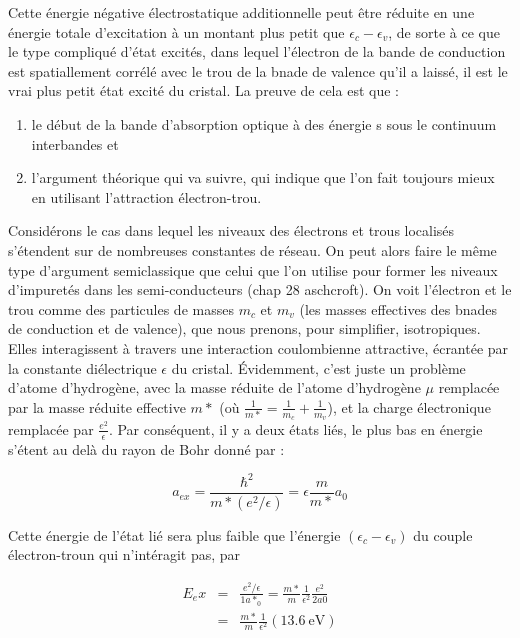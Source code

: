 Cette énergie négative électrostatique additionnelle peut être réduite en une énergie totale d'excitation à un montant plus petit que $\epsilon_c - \epsilon_v$, de sorte à ce que le type compliqué d'état excités, dans lequel l'électron de la bande de conduction est spatiallement corrélé avec le trou de la bnade de valence qu'il a laissé, il est le vrai plus petit état excité du cristal. La preuve de cela est que :
\begin{enumerate}
    \item le début de la bande d'absorption optique à des énergie s sous le continuum interbandes et
    \item l'argument théorique qui va suivre, qui indique que l'on fait toujours mieux en utilisant l'attraction électron-trou.
\end{enumerate}

Considérons le cas dans lequel les niveaux des électrons et trous localisés s'étendent sur de nombreuses constantes de réseau. On peut alors faire le même type d'argument semiclassique que celui que l'on utilise pour former les niveaux d'impuretés dans les semi-conducteurs (chap 28 aschcroft). On voit l'électron et le trou comme des particules de masses $m_c$ et $m_v$ (les masses effectives des bnades de conduction et de valence), que  nous prenons, pour simplifier, isotropiques. Elles interagissent à travers une interaction coulombienne attractive, écrantée par la constante diélectrique $\epsilon$ du cristal. Évidemment, c'est juste un problème d'atome d'hydrogène, avec la masse réduite de l'atome d'hydrogène $\mu$ remplacée par la masse réduite effective $m*$ (où $\frac{1}{m*} = \frac{1}{m_c} + \frac{1}{m_v}$), et la charge électronique remplacée par $\frac{e^2}{\epsilon}$. Par conséquent, il y a deux états liés, le plus bas en énergie s'étent au delà du rayon de Bohr donné par :

\begin{equation}
    a_{ex} = \frac{\hbar^2}{m*(e^2/\epsilon)} = \epsilon \frac{m}{m*} a_0
\end{equation}

Cette énergie de l'état lié sera plus faible que l'énergie $(\epsilon_c - \epsilon_v)$ du couple électron-troun qui n'intéragit pas, par

\begin{eqnarray}
    E_ex & = & \frac{e^2/\epsilon}{1a*_0} = \frac{m*}{m} \frac{1}{\epsilon^2} \frac{e^2}{2a0}\\
    & = & \frac{m*}{m} \frac{1}{\epsilon^2} (\SI{13.6}{\electronvolt})
\end{eqnarray}

